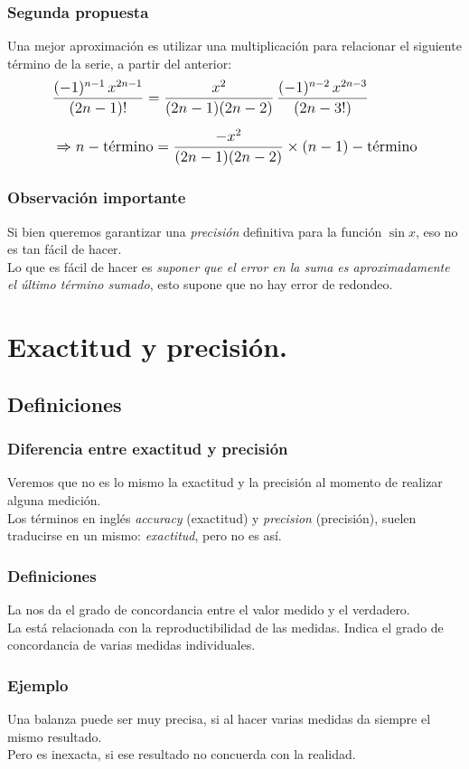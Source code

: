\begin{frame}
\frametitle{Segunda propuesta}
Una mejor aproximación es utilizar una multiplicación para relacionar el siguiente término de la serie, a partir del anterior:
\begin{align}
\fontsize{12}{12}\selectfont
\begin{aligned}
&\dfrac{(-1)^{n-1} \, x^{2 n - 1}}{(2 n - 1)!} = \dfrac{x^{2}}{(2 n - 1)(2 n - 2)} \, \dfrac{(-1)^{n-2} \, x^{2 n - 3}}{(2 n - 3!)} \\[0.5em]
&\Rightarrow n-\mbox{término} = \dfrac{- x^{2}}{(2 n - 1)(2 n - 2)} \times (n-1)-\mbox{término}
\end{aligned}
\label{eq:termino_suma}
\end{align}
\end{frame}
\begin{frame}
\frametitle{Observación importante}
Si bien queremos garantizar una \emph{precisión} definitiva para la función $\sin x$, eso no es tan fácil de hacer.
\\
\bigskip
\pause
Lo que es fácil de hacer es \emph{suponer que el error en la suma es aproximadamente el último término sumado}, esto supone que no hay error de redondeo.
\end{frame}
\section{Exactitud y precisión.}
\subsection{Definiciones}
\begin{frame}[fragile]
\frametitle{Diferencia entre exactitud y precisión}
Veremos que no es lo mismo la exactitud y la precisión al momento de realizar alguna medición.
\\
\bigskip
Los términos en inglés \textit{accuracy} (exactitud) y \textit{precision} (precisión), suelen traducirse en un mismo: \emph{exactitud}, pero no es así.
\end{frame}
\begin{frame}[fragile]
\frametitle{Definiciones}
La  nos da el grado de concordancia entre el valor medido y el verdadero.
\\
\bigskip
\pause
La  está relacionada con la reproductibilidad de las medidas. Indica el grado de concordancia de varias medidas individuales.
\end{frame}
\begin{frame}[fragile]
\frametitle{Ejemplo}
Una balanza puede ser muy precisa, si al hacer varias medidas da siempre el mismo resultado.
\\
\bigskip
Pero es inexacta, si ese resultado no concuerda con la realidad.
\end{frame}
